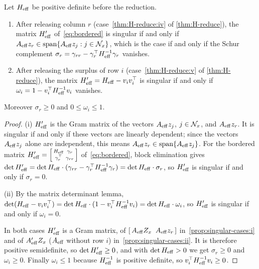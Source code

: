 \begin{prop} \label{prop:singular-cases}
Let $H_{\mathrm{eff}}$ be positive definite before the reduction.
\begin{enumerate}
    \item \label{prop:singular-cases:i} After releasing column $r$ (case~\ref{thm:H-reduce:iv} of \cref{thm:H-reduce}), the matrix $H_{\mathrm{eff}}'$ of~\eqref{eq:bordered} is
          singular if and only if $A_{\mathrm{eff}} z_r\in\operatorname{span}\{A_{\mathrm{eff}} z_j : j\in\mathcal{N}_x\}$, which is the case if
          and only if the Schur complement $\sigma_r = \gamma_{rr} - \gamma_r^\top H_{\mathrm{eff}}^{-1}\gamma_r$ vanishes.
    \item \label{prop:singular-cases:ii} After releasing the surplus of row $i$ (case~\ref{thm:H-reduce:v} of \cref{thm:H-reduce}), the matrix $H_{\mathrm{eff}}' = H_{\mathrm{eff}} - v_iv_i^\top$
          is singular if and only if $\omega_i = 1 - v_i^\top H_{\mathrm{eff}}^{-1}v_i$ vanishes.
\end{enumerate}
Moreover $\sigma_r\ge0$ and $0\le\omega_i\le1$.
\end{prop}

\begin{proof}
(i) $H_{\mathrm{eff}}'$ is the Gram matrix of the vectors $A_{\mathrm{eff}} z_j$, $j\in\mathcal{N}_x$, and $A_{\mathrm{eff}} z_r$. It
is singular if and only if these vectors are linearly dependent; since the vectors $A_{\mathrm{eff}} z_j$
alone are independent, this means $A_{\mathrm{eff}} z_r\in\operatorname{span}\{A_{\mathrm{eff}} z_j\}$. For the bordered matrix
$H_{\mathrm{eff}}' = \left[\begin{smallmatrix}H_{\mathrm{eff}} & \gamma_r\\ \gamma_r^\top & \gamma_{rr}\end{smallmatrix}\right]$
of~\eqref{eq:bordered}, block elimination gives
$\det H_{\mathrm{eff}}' = \det H_{\mathrm{eff}}\cdot(\gamma_{rr} - \gamma_r^\top H_{\mathrm{eff}}^{-1}\gamma_r) = \det H_{\mathrm{eff}}\cdot\sigma_r$,
so $H_{\mathrm{eff}}'$ is singular if and only if $\sigma_r = 0$.

(ii) By the matrix determinant lemma, $\det(H_{\mathrm{eff}} - v_iv_i^\top) = \det H_{\mathrm{eff}}\cdot(1 - v_i^\top H_{\mathrm{eff}}^{-1}v_i)
= \det H_{\mathrm{eff}}\cdot\omega_i$, so $H_{\mathrm{eff}}'$ is singular if and only if $\omega_i = 0$.

In both cases $H_{\mathrm{eff}}'$ is a Gram matrix, of $[\,A_{\mathrm{eff}} Z_x\;\;A_{\mathrm{eff}} z_r\,]$ in~\ref{prop:singular-cases:i} and of $A_{\mathrm{eff}}'Z_x$
($A_{\mathrm{eff}}$ without row $i$) in~\ref{prop:singular-cases:ii}. It is therefore positive semidefinite, so
$\det H_{\mathrm{eff}}'\ge0$, and with $\det H_{\mathrm{eff}}>0$ we get $\sigma_r\ge0$ and $\omega_i\ge0$. Finally
$\omega_i\le1$ because $H_{\mathrm{eff}}^{-1}$ is positive definite, so $v_i^\top H_{\mathrm{eff}}^{-1}v_i\ge0$.
\end{proof}

